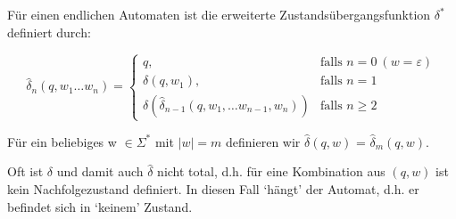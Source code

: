 \documentclass[11pt, a4paper]{article}
\begin{document}
\begin{flushleft}
    \begin{tcolorbox}[title = Definition 3.2]
        Für einen endlichen Automaten ist die erweiterte Zustandsübergangsfunktion \(\delta^*\) definiert durch:

        \begin{equation*}
            \hat{\delta}_n(q, w_1 \ldots w_n) = \begin{cases}
                q,                                                      & \text{falls } n = 0\:(w = \varepsilon) \\
                \delta(q, w_1),                                         & \text{falls } n = 1                    \\
                \delta(\hat{\delta}_{n-1}(q, w_1, \ldots w_{n-1}, w_n)) & \text{falls } n \geq 2
            \end{cases}
        \end{equation*}

        Für ein beliebiges w \(\in \Sigma^*\) mit \(|w| = m\) definieren wir \(\hat{\delta}(q, w)\) = \(\hat{\delta}_m(q, w)\).

        Oft ist \(\delta\) und damit auch \(\hat{\delta}\) nicht total, d.h. für eine Kombination aus \((q, w)\) ist kein Nachfolgezustand definiert. In diesen Fall `hängt' der Automat, d.h. er befindet sich in `keinem' Zustand.

    \end{tcolorbox}

\end{flushleft}

\newpage
\end{document}
